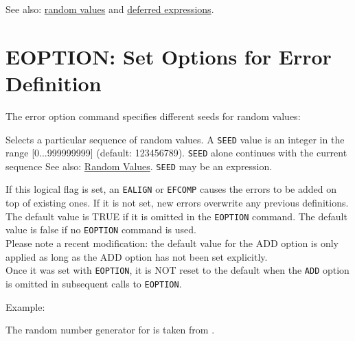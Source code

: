 See also: \hyperref[subsubsec:random]{random values}
and \hyperref[sec:defer]{deferred expressions}.  



%

\section{EOPTION: Set Options for Error Definition} %
\label{sec:eoption}
The error option command specifies different seeds for random values:  

\vspace{2mm}
\vspace{5mm}

\begin{madlist}
   Selects a particular sequence of random values. 
  A {\tt SEED} value is an integer in the range [0...999999999] (default:
  123456789). {\tt SEED} alone continues with the current sequence See
  also: \hyperref[subsubsec:random]{Random Values}. {\tt SEED} may be an expression.  

   If this logical flag is set, an {\tt EALIGN} or {\tt EFCOMP} 
  causes the errors to be added on top of existing ones. If it is not set,
  new errors overwrite any previous definitions. The default value is
  TRUE if it is omitted in the {\tt EOPTION} command. The default value is
  false if no {\tt EOPTION} command is used.  
  \\Please note a recent modification: the default value for the ADD
  option is only applied as long as the ADD option has not been set
  explicitly. 
  \\Once it was set with {\tt EOPTION}, it is NOT reset to the default when
  the {\tt ADD} option is omitted in subsequent calls to {\tt EOPTION}.  
\end{madlist}

Example: 

The random number generator for \madx is taken from
\cite{knuth1981}. 


%

